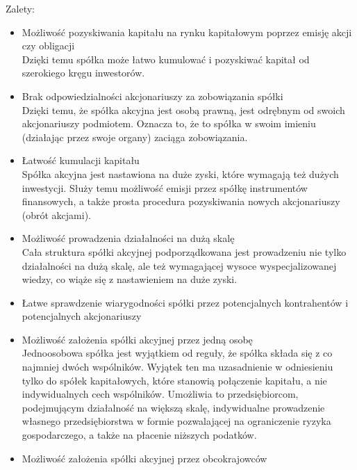 \documentclass[a4paper, 11pt]{article}
\begin{document}
Zalety:\\
\begin{itemize}
\item Możliwość pozyskiwania kapitału na rynku kapitałowym poprzez emisję akcji czy obligacji\\ 

Dzięki temu spółka może łatwo kumulować i pozyskiwać kapitał od szerokiego kręgu inwestorów.
\item Brak odpowiedzialności akcjonariuszy za zobowiązania spółki\\

Dzięki temu, że spółka akcyjna jest osobą prawną, jest odrębnym od swoich akcjonariuszy podmiotem. Oznacza to, że to spółka w swoim imieniu (działając przez swoje organy) zaciąga zobowiązania.
\item Łatwość kumulacji kapitału\\

Spółka akcyjna jest nastawiona na duże zyski, które wymagają też dużych inwestycji. Służy temu możliwość emisji przez spółkę instrumentów finansowych, a także prosta procedura pozyskiwania nowych akcjonariuszy (obrót akcjami). 
\item Możliwość prowadzenia działalności na dużą skalę\\

Cała struktura spółki akcyjnej podporządkowana jest prowadzeniu nie tylko działalności na dużą skalę, ale też wymagającej wysoce wyspecjalizowanej wiedzy, co wiąże się z nastawieniem na duże zyski.
\item Łatwe sprawdzenie wiarygodności spółki przez potencjalnych kontrahentów i potencjalnych akcjonariuszy\\

\item Możliwość założenia spółki akcyjnej przez jedną osobę\\

Jednoosobowa spółka jest wyjątkiem od reguły, że spółka składa się z co najmniej dwóch wspólników. Wyjątek ten ma uzasadnienie w odniesieniu tylko do spółek kapitałowych, które stanowią połączenie kapitału, a nie indywidualnych cech wspólników. Umożliwia to  przedsiębiorcom, podejmującym działalność na większą skalę, indywidualne prowadzenie własnego przedsiębiorstwa w formie pozwalającej na ograniczenie ryzyka gospodarczego, a także na płacenie niższych podatków.
\item Możliwość założenia spółki akcyjnej przez obcokrajowców\\



\end{itemize}
\end{document}
